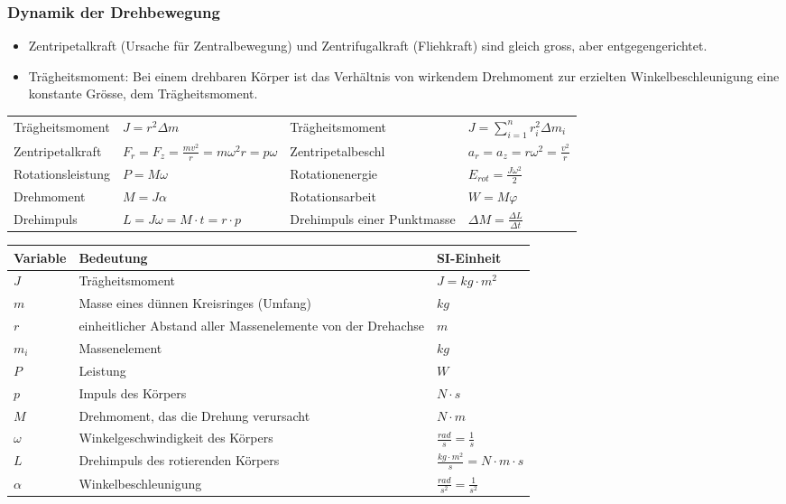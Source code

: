 \subsubsection{Dynamik der Drehbewegung}
\begin{itemize}
	\item Zentripetalkraft (Ursache für Zentralbewegung) und Zentrifugalkraft (Fliehkraft) sind gleich gross, aber entgegengerichtet.
	\item Trägheitsmoment: Bei einem drehbaren Körper ist das Verhältnis von wirkendem Drehmoment zur erzielten Winkelbeschleunigung eine konstante Grösse, dem Trägheitsmoment.
\end{itemize}
\begin{tabbing}
	\begin{tabu} to \linewidth {X l X l}
		\toprule
		Trägheitsmoment & $J = r^2\Delta m$ &
		Trägheitsmoment & $J = \sum_{i=1}^{n}r_i^2 \Delta m_i$ \\
		Zentripetalkraft & $F_r = F_z = \frac{mv^2}{r} = m\omega^2r = p\omega$ & 
		Zentripetalbeschl & $a_r = a_z = r \omega^2 = \frac{v^2}{r}$ \\
		Rotationsleistung & $P = M \omega$ &
		Rotationenergie & $E_{rot} = \frac{J\omega^2}{2}$\\
		Drehmoment & $M = J\alpha$ &
		Rotationsarbeit & $W = M\varphi$ \\
		Drehimpuls & $L = J \omega = M \cdot t = r\cdot p$ & 
		Drehimpuls einer Punktmasse & $\Delta M = \frac{\Delta L}{\Delta t}$ \\
	\end{tabu}
\end{tabbing}

\begin{tabbing}
	\begin{tabu} to \linewidth {l X l}
		Variable & Bedeutung & SI-Einheit \\
		\midrule
		$J$ & Trägheitsmoment & $J = kg \cdot m^2$ \\ 
		$m$ & Masse eines dünnen Kreisringes (Umfang) & $kg$ \\ 
		$r$ & einheitlicher Abstand aller Massenelemente von der Drehachse & $m$ \\ 
		$m_i$ & Massenelement & $kg$\\ 
		$P$ & Leistung & $W$ \\ 
		$p$ & Impuls des Körpers & $N \cdot s$ \\
		$M$ & Drehmoment, das die Drehung verursacht & $N \cdot m$ \\ 
		$\omega$ & Winkelgeschwindigkeit des Körpers & $\frac{rad}{s} = \frac{1}{s}$ \\ 
		$L$ & Drehimpuls des rotierenden Körpers & $\frac{kg \cdot m^2}{s} = N \cdot m \cdot s$  \\ 
		$\alpha$ & Winkelbeschleunigung & $\frac{rad}{s^2} = \frac{1}{s^2}$ \\
		\bottomrule
	\end{tabu}
\end{tabbing}



